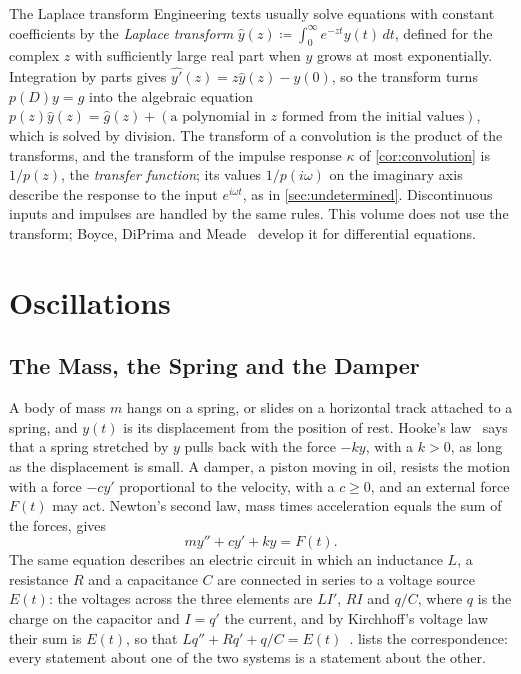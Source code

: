 \begin{note}{The Laplace transform}
Engineering texts usually solve equations with constant coefficients by the \emph{Laplace transform} $\hat y(z)\coloneqq\int_0^\infty e^{-zt}y(t)\,dt$, defined for the complex $z$ with sufficiently large real part when $y$ grows at most exponentially. Integration by parts gives $\widehat{y'}(z)=z\hat y(z)-y(0)$, so the transform turns $p(D)y=g$ into the algebraic equation $p(z)\hat y(z)=\hat g(z)+(\text{a polynomial in }z\text{ formed from the initial values})$, which is solved by division. The transform of a convolution is the product of the transforms, and the transform of the impulse response $\kappa$ of \cref{cor:convolution} is $1/p(z)$, the \emph{transfer function}; its values $1/p(i\omega)$ on the imaginary axis describe the response to the input $e^{i\omega t}$, as in \cref{sec:undetermined}. Discontinuous inputs and impulses are handled by the same rules. This volume does not use the transform; Boyce, DiPrima and Meade~\cite[Chap.~6]{boyce2017} develop it for differential equations.
\end{note}

\section{Oscillations}
\label{sec:oscillations}

\subsection{The Mass, the Spring and the Damper}

A body of mass $m$ hangs on a spring, or slides on a horizontal track attached to a spring, and $y(t)$ is its displacement from the position of rest. Hooke's law~\cite{hooke1678} says that a spring stretched by $y$ pulls back with the force $-ky$, with a  $k>0$, as long as the displacement is small. A damper, a piston moving in oil, resists the motion with a force $-cy'$ proportional to the velocity, with a  $c\ge0$, and an external force $F(t)$ may act. Newton's second law, mass times acceleration equals the sum of the forces, gives
\begin{equation}
my''+cy'+ky=F(t) .
\label{eq:oscillator}
\end{equation}
The same equation describes an electric circuit in which an inductance $L$, a resistance $R$ and a capacitance $C$ are connected in series to a voltage source $E(t)$: the voltages across the three elements are $LI'$, $RI$ and $q/C$, where $q$ is the charge on the capacitor and $I=q'$ the current, and by Kirchhoff's voltage law their sum is $E(t)$, so that $Lq''+Rq'+q/C=E(t)$~\cite[Chap.~3]{boyce2017}.  lists the correspondence: every statement about one of the two systems is a statement about the other.

